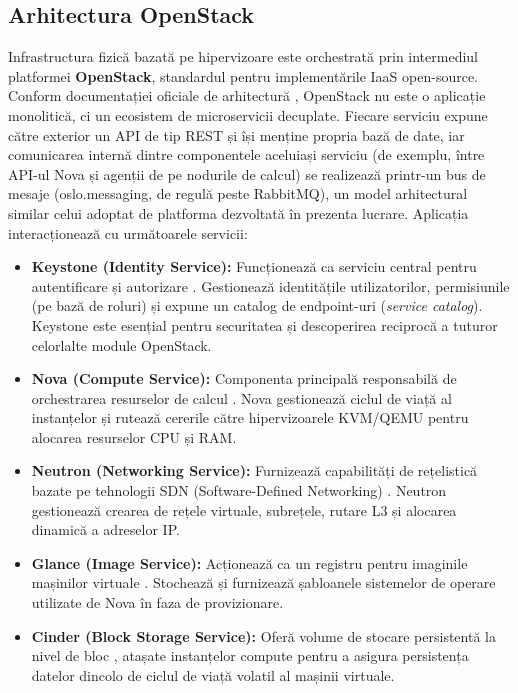 \subsection{Arhitectura OpenStack}

Infrastructura fizică bazată pe hipervizoare este orchestrată prin intermediul platformei \textbf{OpenStack}, standardul pentru implementările IaaS open-source. Conform documentației oficiale de arhitectură \cite{openstack_architecture}, OpenStack nu este o aplicație monolitică, ci un ecosistem de microservicii decuplate. Fiecare serviciu expune către exterior un API de tip REST și își menține propria bază de date, iar comunicarea internă dintre componentele aceluiași serviciu (de exemplu, între API-ul Nova și agenții de pe nodurile de calcul) se realizează printr-un bus de mesaje (oslo.messaging, de regulă peste RabbitMQ), un model arhitectural similar celui adoptat de platforma dezvoltată în prezenta lucrare. Aplicația interacționează cu următoarele servicii:

\begin{itemize}
    \item \textbf{Keystone (Identity Service):} Funcționează ca serviciu central pentru autentificare și autorizare \cite{openstack_keystone}. Gestionează identitățile utilizatorilor, permisiunile (pe bază de roluri) și expune un catalog de endpoint-uri (\textit{service catalog}). Keystone este esențial pentru securitatea și descoperirea reciprocă a tuturor celorlalte module OpenStack.
    \item \textbf{Nova (Compute Service):} Componenta principală responsabilă de orchestrarea resurselor de calcul \cite{openstack_nova}. Nova gestionează ciclul de viață al instanțelor și rutează cererile către hipervizoarele KVM/QEMU pentru alocarea resurselor CPU și RAM.
    \item \textbf{Neutron (Networking Service):} Furnizează capabilități de rețelistică bazate pe tehnologii SDN (Software-Defined Networking) \cite{openstack_neutron}. Neutron gestionează crearea de rețele virtuale, subrețele, rutare L3 și alocarea dinamică a adreselor IP.
    \item \textbf{Glance (Image Service):} Acționează ca un registru pentru imaginile mașinilor virtuale \cite{openstack_glance}. Stochează și furnizează șabloanele sistemelor de operare utilizate de Nova în faza de provizionare.
    \item \textbf{Cinder (Block Storage Service):} Oferă volume de stocare persistentă la nivel de bloc \cite{openstack_cinder}, atașate instanțelor compute pentru a asigura persistența datelor dincolo de ciclul de viață volatil al mașinii virtuale.
\end{itemize}

